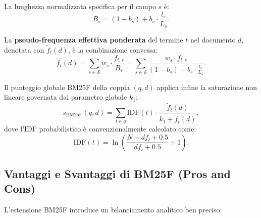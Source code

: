 La lunghezza normalizzata specifica per il campo $s$ \`e:
\begin{equation}
    B_s = (1 - b_s) + b_s \cdot \frac{l_s}{L_s}.
    \label{eq:field-length-norm}
\end{equation}

La \textbf{pseudo-frequenza effettiva ponderata} del termine $t$ nel documento $d$, denotata con $\tilde{f}_t(d)$, \`e la combinazione convessa:
\begin{equation}
    \tilde{f}_t(d) = \sum_{s \in \mathcal{S}} w_s \cdot \frac{f_{t, s}}{B_s} = \sum_{s \in \mathcal{S}} \frac{w_s \cdot f_{t, s}}{(1 - b_s) + b_s \cdot \frac{l_s}{L_s}}.
    \label{eq:bm25f-weighted-tf}
\end{equation}

Il punteggio globale BM25F della coppia $(q, d)$ applica infine la saturazione non lineare governata dal parametro globale $k_1$:
\begin{equation}
    s_{\text{BM25F}}(q, d) = \sum_{t \in q} \text{IDF}(t) \cdot \frac{\tilde{f}_t(d)}{k_1 + \tilde{f}_t(d)},
    \label{eq:bm25f-final-score}
\end{equation}
dove l'IDF probabilistico \`e convenzionalmente calcolato come:
\begin{equation}
    \text{IDF}(t) = \ln \left( \frac{N - df_t + 0.5}{df_t + 0.5} + 1 \right).
\end{equation}

\FloatBarrier
\subsection{Vantaggi e Svantaggi di BM25F (Pros and Cons)}
\label{subsec:pros-cons-bm25f}

L'estensione BM25F introduce un bilanciamento analitico ben preciso:


